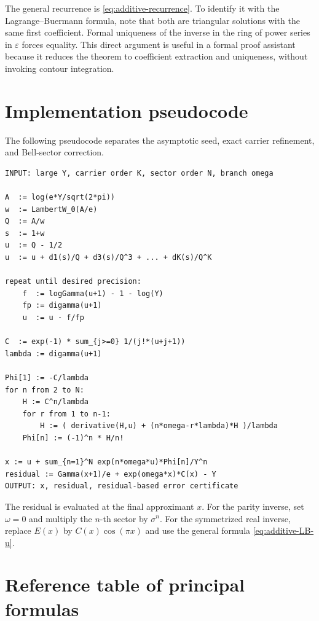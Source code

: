 \documentclass[11pt]{article}
\numberwithin{equation}{section}
\theoremstyle{mainthm}
\theoremstyle{defstyle}
\theoremstyle{remark}
\begin{document}
The general recurrence is \cref{eq:additive-recurrence}.  To identify it with the Lagrange--Buermann formula, note that both are triangular solutions with the same first coefficient.  Formal uniqueness of the inverse in the ring of power series in \(\varepsilon\) forces equality.  This direct argument is useful in a formal proof assistant because it reduces the theorem to coefficient extraction and uniqueness, without invoking contour integration.

\section{Implementation pseudocode}\label{app:pseudocode}

The following pseudocode separates the asymptotic seed, exact carrier refinement, and Bell-sector correction.

\begin{verbatim}
INPUT: large Y, carrier order K, sector order N, branch omega

A  := log(e*Y/sqrt(2*pi))
w  := LambertW_0(A/e)
Q  := A/w
s  := 1+w
u  := Q - 1/2
u  := u + d1(s)/Q + d3(s)/Q^3 + ... + dK(s)/Q^K

repeat until desired precision:
    f  := logGamma(u+1) - 1 - log(Y)
    fp := digamma(u+1)
    u  := u - f/fp

C  := exp(-1) * sum_{j>=0} 1/(j!*(u+j+1))
lambda := digamma(u+1)

Phi[1] := -C/lambda
for n from 2 to N:
    H := C^n/lambda
    for r from 1 to n-1:
        H := ( derivative(H,u) + (n*omega-r*lambda)*H )/lambda
    Phi[n] := (-1)^n * H/n!

x := u + sum_{n=1}^N exp(n*omega*u)*Phi[n]/Y^n
residual := Gamma(x+1)/e + exp(omega*x)*C(x) - Y
OUTPUT: x, residual, residual-based error certificate
\end{verbatim}

The residual is evaluated at the final approximant \(x\).  For the parity inverse, set \(\omega=0\) and multiply the \(n\)-th sector by \(\sigma^n\).  For the symmetrized real inverse, replace \(E(x)\) by \(C(x)\cos(\pi x)\) and use the general formula \cref{eq:additive-LB-u}.

\section{Reference table of principal formulas}\label{app:formula-table}
\end{document}
